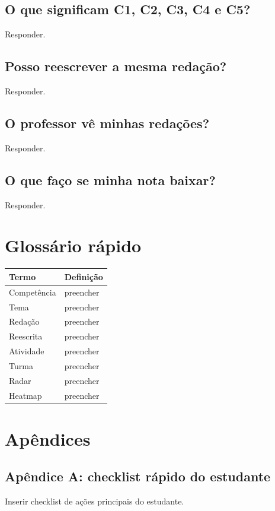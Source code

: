 \documentclass[12pt,a4paper]{article}
\begin{document}
\subsection{O que significam C1, C2, C3, C4 e C5?}
Responder.

\subsection{Posso reescrever a mesma redação?}
Responder.

\subsection{O professor vê minhas redações?}
Responder.

\subsection{O que faço se minha nota baixar?}
Responder.

\section{Glossário rápido}

\begin{longtable}{|p{4cm}|p{10cm}|}
\hline
\textbf{Termo} & \textbf{Definição} \\
\hline
Competência & preencher \\
\hline
Tema & preencher \\
\hline
Redação & preencher \\
\hline
Reescrita & preencher \\
\hline
Atividade & preencher \\
\hline
Turma & preencher \\
\hline
Radar & preencher \\
\hline
Heatmap & preencher \\
\hline
\end{longtable}

\section{Apêndices}

\subsection{Apêndice A: checklist rápido do estudante}
Inserir checklist de ações principais do estudante.
\end{document}
